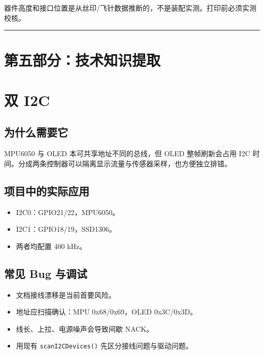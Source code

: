 \documentclass[
  UTF8,11pt,a4paper]{ctexart}
\newcommand{\passthrough}[1]{#1}
\providecommand{\tightlist}{%
  \setlength{\itemsep}{0pt}\setlength{\parskip}{0pt}}
\begin{document}
器件高度和接口位置是从丝印/飞针数据推断的，不是装配实测。打印前必须实测校核。

\begin{center}\rule{0.5\linewidth}{0.5pt}\end{center}

\section{第五部分：技术知识提取}\label{ux7b2cux4e94ux90e8ux5206ux6280ux672fux77e5ux8bc6ux63d0ux53d6}

\section{双 I2C}\label{ux53cc-i2c}

\subsection{为什么需要它}\label{ux4e3aux4ec0ux4e48ux9700ux8981ux5b83}

MPU6050 与 OLED 本可共享地址不同的总线，但 OLED 整帧刷新会占用 I2C
时间。分成两条控制器可以隔离显示流量与传感器采样，也方便独立排错。

\subsection{项目中的实际应用}\label{ux9879ux76eeux4e2dux7684ux5b9eux9645ux5e94ux7528}

\begin{itemize}
\tightlist
\item
  I2C0：GPIO21/22，MPU6050。
\item
  I2C1：GPIO18/19，SSD1306。
\item
  两者均配置 400 kHz。
\end{itemize}

\subsection{常见 Bug 与调试}\label{ux5e38ux89c1-bug-ux4e0eux8c03ux8bd5}

\begin{itemize}
\tightlist
\item
  文档接线漂移是当前首要风险。
\item
  地址应扫描确认：MPU 0x68/0x69，OLED 0x3C/0x3D。
\item
  线长、上拉、电源噪声会导致间歇 NACK。
\item
  用现有 \passthrough{\lstinline!scanI2CDevices()!}
  先区分接线问题与驱动问题。
\end{itemize}
\end{document}
